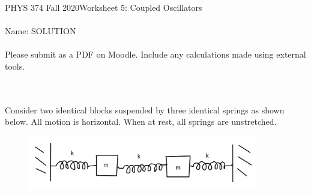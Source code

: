 \documentclass[12pt]{article}
\newcommand{\purple}[1]{{\color{purple} #1}}
\begin{document}
PHYS 374 Fall 2020\hfill Worksheet 5: Coupled Oscillators\\
\\
Name: \purple{SOLUTION}\\
\\
Please submit as a PDF on Moodle. Include any calculations made using external tools.

\hrulefill
\\
\\
Consider two identical blocks suspended by three identical springs as shown below. All motion is horizontal. When at rest, all springs are unstretched. 
\begin{figure}[h]
\includegraphics[width=10cm]{coupled-oscillators.png}
\centering
\end{figure}
\end{document}
